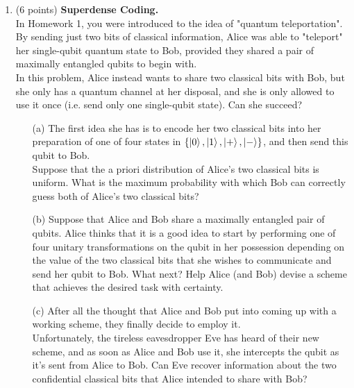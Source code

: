 \documentclass[12pt]{article}
\begin{document}
\begin{enumerate}
		




\item (6 points) \textbf{Superdense Coding.}\\
In Homework 1, you were introduced to the idea of "quantum teleportation". By sending just two bits of classical information, Alice was able to "teleport" her single-qubit quantum state to Bob, provided they shared a pair of maximally entangled qubits to begin with. \\
In this problem, Alice instead wants to share two classical bits with Bob, but she only has a quantum channel at her disposal, and she is only allowed to use it once (i.e. send only one single-qubit state). Can she succeed? \\
\begin{enumerate}
\item[(a)] The first idea she has is to encode her two classical bits into her preparation of one of four states in $\{ \ket{0}, \ket{1}, \ket{+}, \ket{-}\}$, and then send this qubit to Bob. \\
Suppose that the a priori distribution of Alice's two classical bits is uniform. What is the maximum probability with which Bob can correctly guess both of Alice's two classical bits?\\
\item[(b)] Suppose that Alice and Bob share a maximally entangled pair of qubits. Alice thinks that it is a good idea to start by performing one of four unitary transformations on the qubit in her possession depending on the value of the two classical bits that she wishes to communicate and send her qubit to Bob. What next? Help Alice (and Bob) devise a scheme that achieves the desired task with certainty.\\
\item[(c)] After all the thought that Alice and Bob put into coming up with a working scheme, they finally decide to employ it.\\
Unfortunately, the tireless eavesdropper Eve has heard of their new scheme, and as soon as Alice and Bob use it, she intercepts the qubit as it's sent from Alice to Bob. Can Eve recover information about the two confidential classical bits that Alice intended to share with Bob?\\
\end{enumerate}



\end{enumerate}
\end{document}
